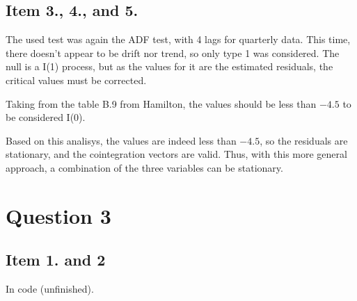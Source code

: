 \documentclass[12pt]{article}
\begin{document}
\subsection*{Item 3., 4., and 5.}
The used test was again the ADF test, with 4 lags for quarterly data. This time, there doesn't appear to be drift nor trend, so only type 1 was considered. The null is a I(1) process, but as the values for it are the estimated residuals, the critical values must be corrected.

Taking from the table B.9 from Hamilton, the values should be less than $-4.5$ to be considered I(0).





Based on this analisys, the values are indeed less than $-4.5$, so the residuals are stationary, and the cointegration vectors are valid. Thus, with this more general approach, a combination of the three variables can be stationary.



\section*{Question 3}

\subsection*{Item 1. and 2}

In code (unfinished).
\end{document}
